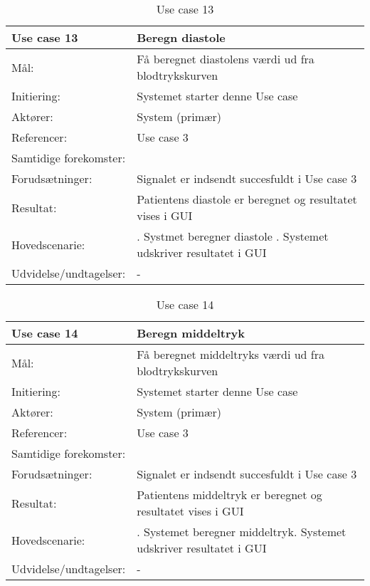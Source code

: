 \begin{table}[h!]
\caption{Use case 13}\label{tab:tabel3}
\begin{tabular}{| l | >{\raggedright\arraybackslash}p{11cm} |}
   \hline
   \textbf{Use case 13} & \textbf{Beregn diastole}\\ \hline
   Mål: & Få beregnet diastolens værdi ud fra blodtrykskurven \\ \hline
   Initiering: & Systemet starter denne Use case\\ \hline
   Aktører:& System (primær)\\ \hline
   Referencer: & Use case 3\\ \hline
   Samtidige forekomster: & \\\hline
   Forudsætninger: & Signalet er indsendt succesfuldt i Use case 3 \\ \hline
   Resultat:& Patientens diastole er beregnet og resultatet vises i GUI\\ \hline
   Hovedscenarie:& 
1. Systmet beregner diastole \newline
2. Systemet udskriver resultatet i GUI \\\hline
Udvidelse/undtagelser: & -\\\hline
\end{tabular}
\end{table}


\begin{table}[h!]
\caption{Use case 14}\label{tab:tabel3}
\begin{tabular}{| l | >{\raggedright\arraybackslash}p{11cm} |}
   \hline
   \textbf{Use case 14} & \textbf{Beregn middeltryk}\\ \hline
   Mål: & Få beregnet middeltryks værdi ud fra blodtrykskurven \\ \hline
   Initiering: & Systemet starter denne Use case\\ \hline
   Aktører:& System (primær)\\ \hline
   Referencer: & Use case 3\\ \hline
   Samtidige forekomster: & \\\hline
   Forudsætninger: & Signalet er indsendt succesfuldt i Use case 3 \\ \hline
   Resultat:& Patientens middeltryk er beregnet og resultatet vises i GUI\\ \hline
   Hovedscenarie:& 
1. Systemet beregner middeltryk\newline
2. Systemet udskriver resultatet i GUI \\\hline
Udvidelse/undtagelser: & -\\\hline
\end{tabular}
\end{table}


